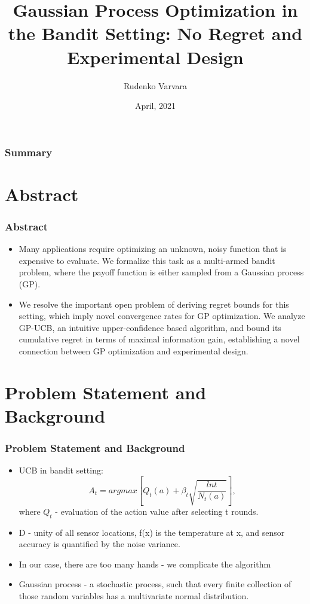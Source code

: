 \documentclass[10pt]{beamer}
\title[Title]{Gaussian Process Optimization in the Bandit Setting: No Regret and Experimental Design}
\author{\large{Rudenko Varvara} }
\institute[MIPT]
{\footnotesize
\texttt{[image: pic/11.png]}
}
\date{April, 2021}
\begin{document}
\begin{frame}
    \titlepage
\end{frame}

\begin{frame}
    \frametitle{Summary} 
    \tableofcontents 
\end{frame}
 

\section{Abstract}
\begin{frame}
    \frametitle{Abstract}
    \begin{itemize}
        \item Many applications require optimizing an unknown, noisy   function that is expensive to evaluate. We formalize this task as a  multi-armed bandit problem, where the payoff function is either sampled from a Gaussian process (GP).  
        \item We resolve the important open problem of deriving regret bounds for this setting, which imply novel convergence rates for GP optimization.   We analyze GP-UCB, an intuitive upper-confidence based algorithm, and bound its cumulative regret in terms of maximal information gain, establishing a novel connection between GP optimization and experimental design.
    \end{itemize}
\end{frame}


\section{Problem Statement and Background}
\begin{frame}
\frametitle{Problem Statement and Background}
    \begin{itemize}
    \item UCB in bandit setting:
        \begin{equation}
            A_{t}=argmax\left [ Q_{t}(a)+\beta_{t}\sqrt{\frac{ln t}{N_{t}(a)}} \right ],
        \end{equation}
        where ${Q_{t}}$ - evaluation of the action value after selecting t rounds.
    \item D - unity of all sensor locations, f(x) is the temperature at x, and sensor  accuracy  is  quantified  by  the  noise  variance.
    \item In our case, there are too many hands - we complicate the algorithm
    \item Gaussian process - a stochastic process, such that every finite collection of those random variables has a multivariate normal distribution.
    \end{itemize}
\end{frame}
\end{document}

